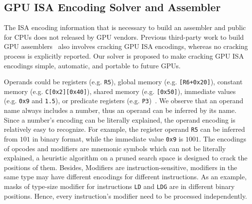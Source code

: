 \subsection{GPU ISA Encoding Solver and Assembler}

The ISA encoding information that is necessary to build an assembler and public for CPUs does not released by GPU vendors.
Previous third-party work to build GPU assemblers~\cite{decuda,asfermi,maxas} also
involves cracking GPU ISA encodings, whereas no cracking process is explicitly reported.
Our solver is proposed to make cracking GPU ISA encodings simple, automatic, and portable to future GPUs.

Operands could be registers (e.g. {\tt R5}),
global memory (e.g. {\tt [R6+0x20]}), constant memory (e.g. {\tt C[0x2][0x40]}), shared memory (e.g. {\tt [0x50]}), immediate values (e.g. {\tt 0x9} and {\tt1.5}), or predicate registers (e.g. {\tt P3})~\cite{ptx2015isa}.
We observe that an operand name always includes a number, thus an operand can be inferred by its name.
Since a number's encoding can be literally explained, the operand encoding is relatively easy to recognize.
For example, the register operand {\tt R5} can be inferred from $101$ in binary format, while the immediate value {\tt 0x9} is $1001$. 
The encodings of opcodes and modifiers are mnemonic symbols which can not be literally explained,
a heuristic algorithm on a pruned search space is designed to crack the positions of them.
Besides, Modifiers are instruction-sensitive, modifiers in the same type may have different encodings for different instructions. 
As an example, masks of type-size modifier for instructions {\tt LD} and {\tt LDG} are in different binary positions. 
Hence, every instruction's modifier need to be processed independently. 







